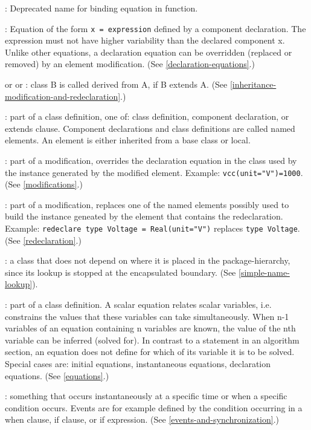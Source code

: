 : Deprecated name for binding equation in function.

: Equation of the form \lstinline!x = expression!
defined by a component declaration. The expression must not have higher
variability than the declared component x. Unlike other equations, a
declaration equation can be overridden (replaced or removed) by an
element modification. (See \autoref{declaration-equations}.)

 or  or :
class B is called derived from A, if B extends A. (See \autoref{inheritance-modification-and-redeclaration}.)

: part of a class definition, one of: class definition,
component declaration, or extends clause. Component declarations and
class definitions are called named elements. An element is either
inherited from a base class or local.

: part of a modification, overrides the
declaration equation in the class used by the instance generated by the
modified element. Example: \lstinline!vcc(unit="V")=1000!. (See \autoref{modifications}.)

: part of a modification, replaces one of
the named elements possibly used to build the instance geneated by the
element that contains the redeclaration. Example: \lstinline!redeclare type Voltage = Real(unit="V")! replaces \lstinline!type Voltage!. (See \autoref{redeclaration}.)

: a class that does not depend on where it is
placed in the package-hierarchy, since its lookup is stopped at the
encapsulated boundary. (See \autoref{simple-name-lookup}).

: part of a class definition. A scalar equation relates
scalar variables, i.e. constrains the values that these variables can
take simultaneously. When n-1 variables of an equation containing n
variables are known, the value of the nth variable can be inferred
(solved for). In contrast to a statement in an algorithm section, an
equation does not define for which of its variable it is to be solved.
Special cases are: initial equations, instantaneous equations,
declaration equations. (See \autoref{equations}.)

: something that occurs instantaneously at a specific time
or when a specific condition occurs. Events are for example defined by
the condition occurring in a when clause, if clause, or if expression.
(See \autoref{events-and-synchronization}.)

